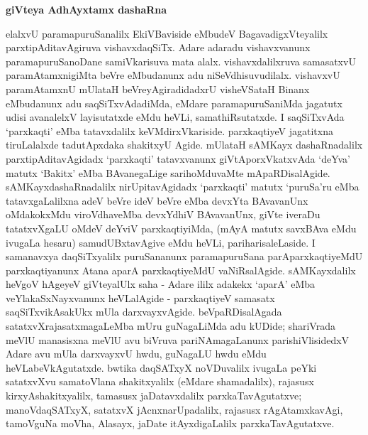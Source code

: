 \begin{center}
\textbf{\Large{giVteya AdhAyxtamx dashaRna}}
\end{center}

elalxvU paramapuruSanalilx EkiVBaviside eMbudeV BagavadigxVteyalilx parxtipAdita\-vAgiruva vishavxdaqSiTx. Adare adaradu vishavxvanunx paramapuruSanoDane samiVkarisuva mata alalx. vishavxdalilxruva samasatxvU paramAtamxnigiMta beVre eMbudanunx adu niSeVdhisuvudilalx. vishavxvU paramAtamxnU mUlataH beVreyAgiradidadxrU visheVSataH Binanx eMbudanunx adu saqSiTxvAdadiMda, eMdare paramapuruSaniMda jagatutx udisi avanalelxV layisutatxde eMdu heVLi, samathiRsutatxde. I saqSiTxvAda `parxkaqti' eMba tatavxdalilx keVMdirxVkariside. parxkaqtiyeV jagatitxna tiruLalalxde tadutApxdaka shakitxyU Agide. mUlataH sAMKayx dashaRnadalilx parxtipAditavAgidadx `parxkaqti' tatavxvanunx giVtAporxVkatxvAda `deYva' matutx `Bakitx' eMba BAvanegaLige sarihoMduvaMte mApaRDisalAgide. sAMKayxdashaRnadalilx nirUpitavAgidadx `parxkaqti' matutx `puruSa'ru eMba tatavxgaLalilxna adeV beVre ideV beVre eMba devxYta BAvavanUnx oMdakokxMdu viroVdhaveMba devxYdhiV BAvavanUnx, giVte iveraDu tatatxvXgaLU oMdeV deYviV parxkaqtiyiMda, (mAyA matutx savxBAva eMdu ivugaLa hesaru) samudUBxtavAgive eMdu heVLi, pariharisaleLaside. I samanavxya daqSiTxyalilx puruSananunx paramapuruSana parAparxkaqtiyeMdU parxkaqtiyanunx Atana aparA parxkaqtiyeMdU vaNiRsalAgide. sAMKayxdalilx heVgoV hAgeyeV giVteyalUlx saha - Adare ililx adakekx `aparA' eMba veYlakaSxNayxvanunx heVLalAgide - parxkaqtiyeV samasatx saqSiTxvikAsakUkx mUla darxvayxvAgide. beVpaRDisalAgada satatxvXrajasatxmagaLeMba mUru guNagaLiMda adu kUDide; shariVrada meVlU manasisxna meVlU avu biVruva pariNAmagaLanunx parishiVlisidedxV Adare avu mUla darxvayxvU hwdu, guNagaLU hwdu eMdu heVLabeVkAgutatxde. bwtika daqSATxyX noVDuvalilx ivugaLa peYki satatxvXvu samatoVlana shakitxyalilx (eMdare shamadalilx), rajasusx kirxyAshakitxyalilx, tamasusx jaDatavxdalilx parxkaTavAgutatxve; manoVdaqSATxyX, satatxvX jAcnxnarUpadalilx, rajasusx rAgAtamxkavAgi, tamoVguNa moVha, Alasayx, jaDate itAyxdigaLalilx parxkaTavAgutatxve.

